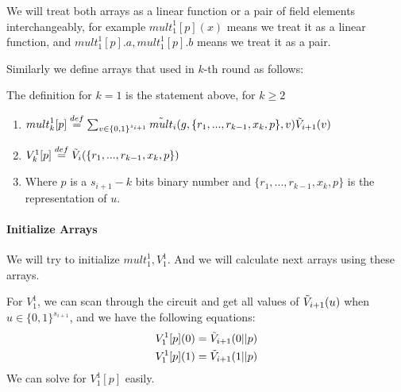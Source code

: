 {We will treat both arrays as a linear function or a pair of field elements interchangeably, for example ${mult}_1^1[p](x)$ means we treat it as a linear function, and ${mult}_1^1[p].a, {mult}_1^1[p].b$ means we treat it as a pair.

Similarly we define arrays that used in $k$-th round as follows:
\begin{definition}

	The definition for $k=1$ is the statement above, for $k\ge 2$
	\begin{enumerate}
		\item ${mult}_k^1[p]\overset{def}{=}\sum_{v\in \{0, 1\}^{s_{i+1}}}\tilde{mult}_i(g, \{r_1, ..., r_{k-1}, x_k, p\}, v)\tilde{V}_{i+1}(v)$
		\item ${V}_k^1[p]\overset{def}{=}\tilde{V}_i(\{r_1, ..., r_{k-1}, x_k, p\})$
		\item Where $p$ is a $s_{i+1}-k$ bits binary number and $\{r_1, ..., r_{k-1}, x_k, p\}$ is the representation of $u$.
	\end{enumerate}
\end{definition}

\paragraph{Initialize Arrays}
We will try to initialize ${mult}_1^1, {V}_1^1$. And we will calculate next arrays using these arrays.

For ${V}_1^1$, we can scan through the circuit and get all values of $\tilde{V}_{i+1}(u)$ when $u \in \{0, 1\}^{s_{i+1}}$, and we have the following equations:
\begin{align*}
{V}_1^1[p](0)=\tilde{V}_{i+1}(0||p)\\
{V}_1^1[p](1)=\tilde{V}_{i+1}(1||p)
\end{align*}
We can solve for ${V}_1^1[p]$ easily.

}
